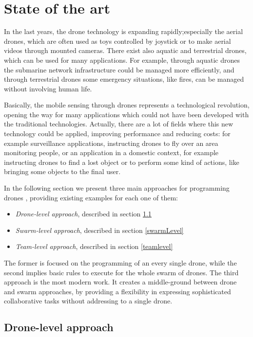 \chapter{State of the art}
\label{cap2}

In the last years, the drone technology is expanding rapidly;especially the aerial drones, which are often used as toys controlled by joystick  or to make aerial videos through mounted cameras.
There exist also aquatic and terrestrial drones, which can be used for many applications. 
For example, through aquatic drones the submarine network infrastructure\cite{submarine} could be managed more efficiently, and through terrestrial drones some emergency situations, like fires, can be managed without involving human life.

Basically, the mobile sensing through drones represents a technological revolution, opening the way for many applications which could not have been developed with the traditional technologies.
Actually, there are a lot of fields where this new technology could be applied, improving performance and reducing costs:
for example surveillance applications, instructing drones to fly over an area monitoring people, or an application in a domestic context, for example instructing drones to find a lost object or to perform some kind of actions, like bringing some objects to the final user.


In the following section we present three main approaches for programming drones , providing existing examples for each one of them:

\begin{itemize}
\itemsep2pt
\item{
\textit{Drone-level approach}, described in section \ref{droneLevel}
}
\item{
\textit{Swarm-level approach}, described in section \ref{swarmLevel}
}
\item{
\textit{Team-level approach}, described in section \ref{teamlevel}
}
\end{itemize}

The former is focused on the programming of an every single drone, while the second implies basic rules to execute for the whole swarm of drones. The third approach is the most modern work. It creates a middle-ground between drone and swarm approaches, by providing a flexibility in expressing sophisticated collaborative tasks without addressing to a single drone.

\newpage

\section {Drone-level approach}\label{droneLevel}

